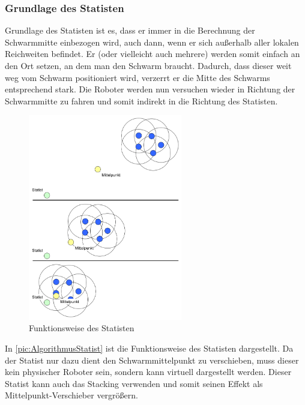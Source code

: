 \subsubsection*{Grundlage des Statisten}

Grundlage des Statisten ist es, dass er immer in die Berechnung der Schwarmmitte einbezogen wird, auch dann, wenn er sich außerhalb aller lokalen Reichweiten befindet. Er (oder vielleicht auch mehrere) werden somit einfach an den Ort setzen, an dem man den Schwarm braucht. Dadurch, dass dieser weit weg vom Schwarm positioniert wird, verzerrt er die Mitte des Schwarms entsprechend stark. Die Roboter werden nun versuchen wieder in Richtung der Schwarmmitte zu fahren und somit indirekt in die Richtung des Statisten.


\begin{figure}[h]
	\centering
	\includegraphics[width=0.6\textwidth,keepaspectratio]{graphics/AlgorithmusStatist.png}
	\caption{Funktionsweise des Statisten}
	\label{pic:AlgorithmusStatist}
\end{figure}

In \autoref{pic:AlgorithmusStatist} ist die Funktionsweise des Statisten dargestellt. Da der Statist nur dazu dient den Schwarmmittelpunkt zu verschieben, muss dieser kein physischer Roboter sein, sondern kann virtuell dargestellt werden. Dieser Statist kann auch das Stacking verwenden und somit seinen Effekt als Mittelpunkt-Verschieber vergrößern.

